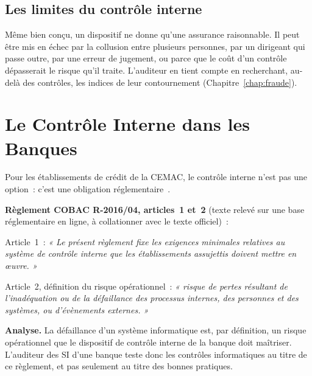 \subsection{Les limites du contrôle interne}

Même bien conçu, un dispositif ne donne qu'une assurance raisonnable. Il
peut être mis en échec par la collusion entre plusieurs personnes, par un
dirigeant qui passe outre, par une erreur de jugement, ou parce que le coût
d'un contrôle dépasserait le risque qu'il traite. L'auditeur en tient compte
en recherchant, au-delà des contrôles, les indices de leur contournement
(Chapitre~\ref{chap:fraude}).

\section{Le Contrôle Interne dans les Banques}
\label{sec:c02-cobac}

Pour les établissements de crédit de la CEMAC, le contrôle interne n'est
pas une option~: c'est une obligation réglementaire~\cite{cobac2016r04}.

\begin{boxjuris}
\textbf{Règlement COBAC R-2016/04, articles~1 et~2} (texte relevé sur une
base réglementaire en ligne, à collationner avec le texte officiel)~:

\medskip
Article~1~: \textit{« Le présent règlement fixe les exigences minimales
relatives au système de contrôle interne que les établissements assujettis
doivent mettre en œuvre. »}

\medskip
Article~2, définition du risque opérationnel~: \textit{« risque de pertes
résultant de l'inadéquation ou de la défaillance des processus internes,
des personnes et des systèmes, ou d'évènements externes. »}

\medskip
\textbf{Analyse.} La défaillance d'un système informatique est, par
définition, un risque opérationnel que le dispositif de contrôle interne de
la banque doit maîtriser. L'auditeur des SI d'une banque teste donc les
contrôles informatiques au titre de ce règlement, et pas seulement au titre
des bonnes pratiques.
\end{boxjuris}

